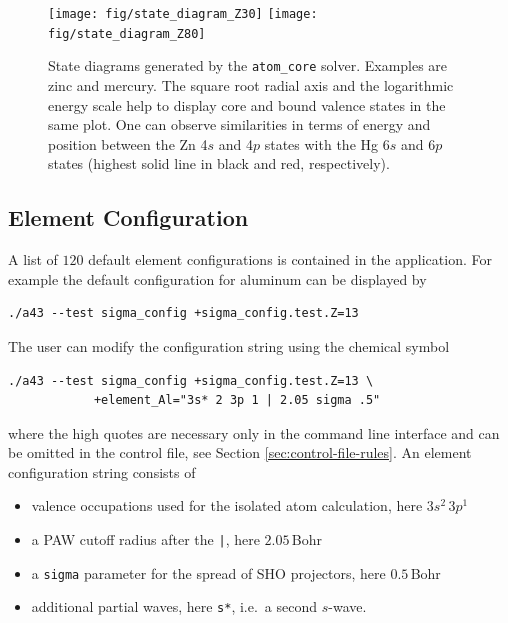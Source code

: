 \documentclass[oribibl]{llncs}
\newcommand{\ttt}[1]{\texttt{#1}}
\begin{document}
\begin{figure}[h]
	\centering
	\texttt{[image: fig/state\_diagram\_Z30]}
	\texttt{[image: fig/state\_diagram\_Z80]}
	\label{fig:core-state-diagrams-Z30-and-Z80}
	\caption{State diagrams generated by the \ttt{atom\_core} solver. 
	         Examples are zinc and mercury.
	         The square root radial axis and the logarithmic energy scale help to display
	         core and bound valence states in the same plot.
	         One can observe similarities in terms of energy and position between
	         the Zn 4$s$ and 4$p$ states with the Hg 6$s$ and 6$p$ states
	         (highest solid line in black and red, respectively). 
	         }
\end{figure}



\subsection{Element Configuration} \label{sec:sigma-config-short}
%
A list of $120$ default element configurations is contained in the application.
For example the default configuration for aluminum can be displayed by
\begin{verbatim}
./a43 --test sigma_config +sigma_config.test.Z=13
\end{verbatim}
The user can modify the configuration string using the chemical symbol
\begin{verbatim}
./a43 --test sigma_config +sigma_config.test.Z=13 \
	        +element_Al="3s* 2 3p 1 | 2.05 sigma .5" 		
\end{verbatim}
where the high quotes are necessary only in the command line interface
and can be omitted in the control file, see Section \ref{sec:control-file-rules}.
%
\noindent
An element configuration string consists of
\begin{itemize}
	\item valence occupations used for the isolated atom calculation, here $3s^2 \, 3p^1$
	\item a \ac{PAW} cutoff radius after the \ttt{|}, here $2.05\,$Bohr
	\item a \ttt{sigma} parameter for the spread of \ac{SHO} projectors, here $0.5\,$Bohr
	\item additional partial waves, here \ttt{s*}, i.e.~a second $s$-wave.
\end{itemize}
\end{document}
